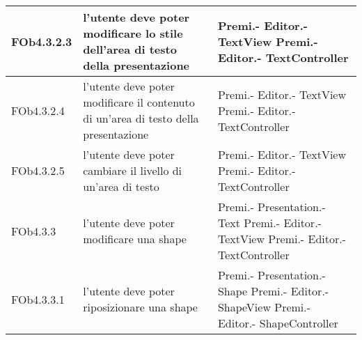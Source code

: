 \begin{longtable}{|l|p{5cm}|p{4cm}|}
\hline
FOb4.3.2.3 & l'utente deve poter modificare lo stile dell'area di testo della presentazione & Premi.- \linebreak Editor.- \linebreak TextView \linebreak Premi.- \linebreak Editor.- \linebreak TextController \linebreak \\
\hline
FOb4.3.2.4 & l'utente deve poter modificare il contenuto di un'area di testo della presentazione & Premi.- \linebreak Editor.- \linebreak TextView \linebreak Premi.- \linebreak Editor.- \linebreak TextController \linebreak \\
\hline
FOb4.3.2.5 & l'utente deve poter cambiare il livello di un'area di testo & Premi.- \linebreak Editor.- \linebreak TextView \linebreak Premi.- \linebreak Editor.- \linebreak TextController \linebreak \\
\hline
FOb4.3.3 & l'utente deve poter modificare una shape & Premi.- \linebreak Presentation.- \linebreak Text \linebreak Premi.- \linebreak Editor.- \linebreak TextView \linebreak Premi.- \linebreak Editor.- \linebreak TextController \linebreak \\
\hline
FOb4.3.3.1 & l'utente deve poter riposizionare una shape & Premi.- \linebreak Presentation.- \linebreak Shape \linebreak Premi.- \linebreak Editor.- \linebreak ShapeView \linebreak Premi.- \linebreak Editor.- \linebreak ShapeController \linebreak \\

\end{longtable}
